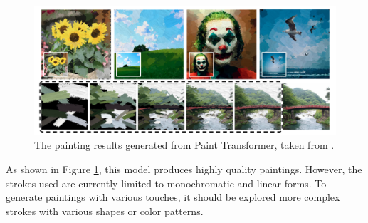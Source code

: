 \vspace{0.7cm}

\begin{figure}[h]
    \centering
    \includegraphics[width=135truemm]{resources/3_related_work/PTresult.png}
    \caption{
        The painting results generated from Paint Transformer,
        taken from \cite{liu2021paint}.
    }
    \label{PTresult}
\end{figure}
As shown in Figure \ref{PTresult}, this model produces highly quality paintings.
However, the strokes used are currently limited to monochromatic and linear forms.
To generate paintings with various touches, it should be explored more complex 
strokes with various shapes or color patterns.

